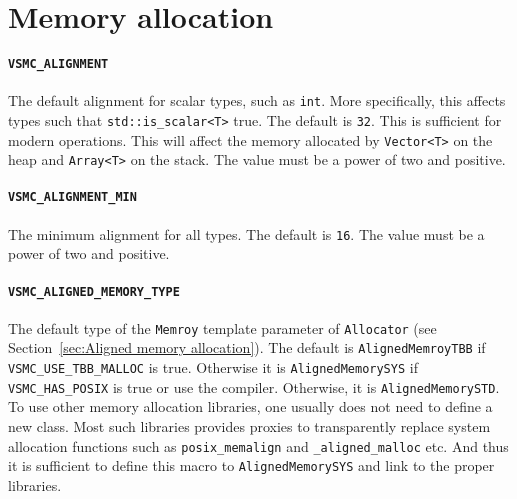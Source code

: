 \section{Memory allocation}
\label{sec:Memory allocation}

\paragraph{\texttt{VSMC\_ALIGNMENT}} The default alignment for scalar types,
such as \verb|int|. More specifically, this affects types such that
\verb|std::is_scalar<T>| true. The default is \verb|32|. This is sufficient for
modern \simd operations. This will affect the memory allocated by
\verb|Vector<T>| on the heap and \verb|Array<T>| on the stack. The value must
be a power of two and positive.

\paragraph{\texttt{VSMC\_ALIGNMENT\_MIN}} The minimum alignment for all types.
The default is \verb|16|. The value must be a power of two and positive.

\paragraph{\texttt{VSMC\_ALIGNED\_MEMORY\_TYPE}} The default type of the
\verb|Memroy| template parameter of \verb|Allocator| (see
Section~\ref{sec:Aligned memory allocation}). The default is
\verb|AlignedMemroyTBB| if \verb|VSMC_USE_TBB_MALLOC| is true. Otherwise it is
\verb|AlignedMemorySYS| if \verb|VSMC_HAS_POSIX| is true or use the \msvc
compiler. Otherwise, it is \verb|AlignedMemorySTD|. To use other memory
allocation libraries, one usually does not need to define a new class. Most
such libraries provides proxies to transparently replace system allocation
functions such as \verb|posix_memalign| and \verb|_aligned_malloc| etc. And
thus it is sufficient to define this macro to \verb|AlignedMemorySYS| and link
to the proper libraries.

